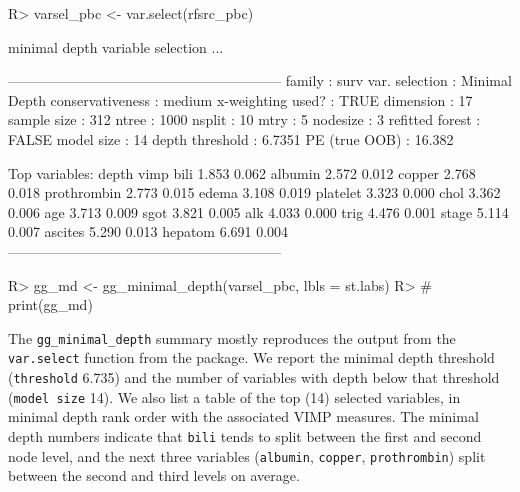 \documentclass[article]{jss}
\begin{document}
\begin{Schunk}
\begin{Sinput}
R> varsel_pbc <- var.select(rfsrc_pbc)
\end{Sinput}
\begin{Soutput}
minimal depth variable selection ...


-----------------------------------------------------------
family             : surv 
var. selection     : Minimal Depth 
conservativeness   : medium 
x-weighting used?  : TRUE 
dimension          : 17 
sample size        : 312 
ntree              : 1000 
nsplit             : 10 
mtry               : 5 
nodesize           : 3 
refitted forest    : FALSE 
model size         : 14 
depth threshold    : 6.7351 
PE (true OOB)      : 16.382 


Top variables:
            depth  vimp
bili        1.853 0.062
albumin     2.572 0.012
copper      2.768 0.018
prothrombin 2.773 0.015
edema       3.108 0.019
platelet    3.323 0.000
chol        3.362 0.006
age         3.713 0.009
sgot        3.821 0.005
alk         4.033 0.000
trig        4.476 0.001
stage       5.114 0.007
ascites     5.290 0.013
hepatom     6.691 0.004
-----------------------------------------------------------
\end{Soutput}
\begin{Sinput}
R> gg_md <- gg_minimal_depth(varsel_pbc, lbls = st.labs)
R> # print(gg_md)
\end{Sinput}
\end{Schunk}

The \texttt{gg\_minimal\_depth} summary mostly reproduces the output
from the \texttt{var.select} function from the 
package. We report the minimal depth threshold (\texttt{threshold}
6.735) and the number of variables with depth below that threshold
(\texttt{model\ size} 14). We also list a table of the top (14) selected
variables, in minimal depth rank order with the associated VIMP
measures. The minimal depth numbers indicate that \texttt{bili} tends to
split between the first and second node level, and the next three
variables (\texttt{albumin}, \texttt{copper}, \texttt{prothrombin})
split between the second and third levels on average.
\end{document}
